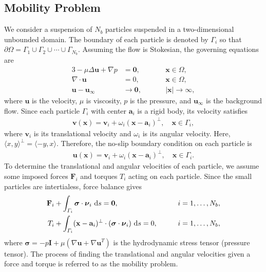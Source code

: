 \documentclass[lineno]{jfm}
\renewcommand{\aa}{\mathbf{a}}
\newcommand{\bd}{\partial}
\newcommand{\FF}{\mathbf{F}}
\newcommand{\nnu}{\boldsymbol{\nu}}
\newcommand{\ssigma}{\boldsymbol{\sigma}}
\newcommand{\xx}{\mathbf{x}}
\newcommand{\uu}{\mathbf{u}}
\renewcommand{\vv}{\mathbf{v}}
\begin{document}
\subsection{\label{mobility}Mobility Problem}
We consider a suspension of $N_b$ particles suspended in a
two-dimensional unbounded domain. The boundary of each particle is
denoted by $\Gamma_i$ so that $\bd \Omega = \Gamma_1 \cup \Gamma_2 \cup
\cdots \cup \Gamma_{N_b}$. Assuming the flow is Stokesian, the governing
equations are
\begin{alignat}{3}
  -\mu \Delta \uu + \nabla p &= \mathbf{0}, 
    && \xx \in \Omega, \\
  \nabla\cdot \uu &= 0, \qquad && \xx \in \Omega, \\
  \uu - \uu_\infty &\to \mathbf{0}, && |\xx| \to \infty,
\end{alignat}
%
where $\uu$ is the velocity, $\mu$ is viscosity, $p$ is the pressure,
and $\uu_\infty$ is the background flow. Since each particle $\Gamma_i$
with center $\aa_i$ is a rigid body, its velocity satisfies 
\begin{align}
  \vv(\xx) = \vv_i + \omega_i (\xx - \aa_i)^\perp, \quad 
    \xx \in \Gamma_i,
\end{align}
where $\vv_i$ is its translational velocity and $\omega_i$ is its
angular velocity. Here, $\langle x, y \rangle^{\perp} = \langle -y, x
\rangle$. Therefore, the no-slip boundary condition on each particle is
\begin{align}
  \uu(\xx) = \vv_i + \omega_i (\xx - \aa_i)^\perp, \quad
    \xx \in \Gamma_i.
\end{align}
To determine the translational and angular velocities of each particle,
we assume some imposed forces $\FF_i$ and torques $T_i$ acting on each
particle. Since the small particles are intertialess, force balance
gives 
\begin{alignat}{2}
  \label{eqn:force}
  \FF_i &+ \int_{\Gamma_i} \ssigma \cdot \nnu_i \, \dif s = \mathbf{0},
  && i=1,\ldots,N_b,\\
  \label{eqn:torque}
  T_i &+ \int_{\Gamma_i} (\xx - \aa_i)^\perp \cdot 
    (\ssigma \cdot \nnu_i) \, \dif s = 0, \qquad && i=1,\ldots,N_b,
\end{alignat}
where $\ssigma = -p \mathbf{I} + \mu \left(\nabla \uu + \nabla \uu^T
\right)$ is the hydrodynamic stress tensor (pressure tensor). The
process of finding the translational and angular velocities given a
force and torque is referred to as the mobility problem.
\end{document}
